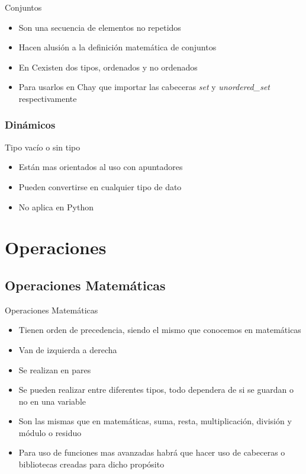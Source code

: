 \documentclass{beamer}
\newcommand{\Rplus}{\protect\hspace{-.1em}\protect\raisebox{.35ex}{\smaller{\smaller\textbf{+}}}}
\newcommand{\Cpp}{\mbox{C\Rplus\Rplus}\hspace{3pt}}
\begin{document}
	\begin{frame}{Conjuntos}
		\begin{itemize}
			\item Son una secuencia de elementos no repetidos
			\item Hacen alusi\'on a la definici\'on matem\'atica de conjuntos
			\item En \Cpp existen dos tipos, ordenados y no ordenados
			\item Para usarlos en \Cpp hay que importar las cabeceras \textit{set} y \textit{unordered\_set} respectivamente\nocite{BHASIN,BJARNE1,BJARNE2,CAIRO,CPP,DEITEL,DOWNEY,JAWORSKI,KENN,lAAKMANN,MATTHES,RAMALHO,SED,BRASSARD}
		\end{itemize}
		\textbf{}\end{frame}
	
	\subsubsection{Din\'amicos}
	\begin{frame}{Tipo vac\'io o sin tipo}
		\begin{itemize}
			\item Est\'an mas orientados al uso con apuntadores
			\item Pueden convertirse en cualquier tipo de dato
			\item No aplica en Python
		\end{itemize}
	\end{frame}
	
	\section{Operaciones}
	
	\subsection{Operaciones Matem\'aticas}
	\begin{frame}{Operaciones Matem\'aticas}
		\begin{itemize}
			\item Tienen orden de precedencia, siendo el mismo que conocemos en matem\'aticas
			\item Van de izquierda a derecha
			\item Se realizan en pares
			\item Se pueden realizar entre diferentes tipos, todo dependera de si se guardan o no en una variable
			\item Son las mismas que en matem\'aticas, suma, resta, multiplicaci\'on, divisi\'on y m\'odulo o residuo
			\item Para uso de funciones mas avanzadas habrá que hacer uso de cabeceras o bibliotecas creadas para dicho prop\'osito
		\end{itemize}
	\end{frame}
	
\end{document}
